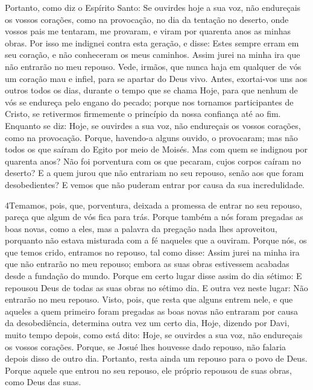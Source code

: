 Portanto, como diz o Espírito Santo: Se ouvirdes hoje a sua voz,
não endureçais os vossos corações, como na provocação, no dia da
tentação no deserto, onde vossos pais me tentaram, me provaram,
e viram por quarenta anos as minhas obras. Por isso me
indignei contra esta geração, e disse: Estes sempre erram em seu
coração, e não conheceram os meus caminhos. Assim jurei na
minha ira que não entrarão no meu repouso. Vede, irmãos, que
nunca haja em qualquer de vós um coração mau e infiel, para se
apartar do Deus vivo. Antes, exortai-vos uns aos outros todos
os dias, durante o tempo que se chama Hoje, para que nenhum de vós
se endureça pelo engano do pecado; porque nos tornamos
participantes de Cristo, se retivermos firmemente o princípio da
nossa confiança até ao fim. Enquanto se diz: Hoje, se
ouvirdes a sua voz, não endureçais os vossos corações, como na
provocação. Porque, havendo-a alguns ouvido, o provocaram;
mas não todos os que saíram do Egito por meio de Moisés. Mas
com quem se indignou por quarenta anos? Não foi porventura com os
que pecaram, cujos corpos caíram no deserto? E a quem jurou
que não entrariam no seu repouso, senão aos que foram desobedientes?
E vemos que não puderam entrar por causa da sua
incredulidade.

\medskip

\lettrine{4} Temamos, pois, que, porventura, deixada a
promessa de entrar no seu repouso, pareça que algum de vós fica para
trás. Porque também a nós foram pregadas as boas novas, como a
eles, mas a palavra da pregação nada lhes aproveitou, porquanto não
estava misturada com a fé naqueles que a ouviram. Porque nós, os
que temos crido, entramos no repouso, tal como disse: Assim jurei na
minha ira que não entrarão no meu repouso; embora as suas obras
estivessem acabadas desde a fundação do mundo. Porque em certo
lugar disse assim do dia sétimo: E repousou Deus de todas as suas
obras no sétimo dia. E outra vez neste lugar: Não entrarão no
meu repouso. Visto, pois, que resta que alguns entrem nele, e
que aqueles a quem primeiro foram pregadas as boas novas não
entraram por causa da desobediência, determina outra vez um
certo dia, Hoje, dizendo por Davi, muito tempo depois, como está
dito: Hoje, se ouvirdes a sua voz, não endureçais os vossos
corações. Porque, se Josué lhes houvesse dado repouso, não
falaria depois disso de outro dia. Portanto, resta ainda um
repouso para o povo de Deus. Porque aquele que entrou no seu
repouso, ele próprio repousou de suas obras, como Deus das suas.

